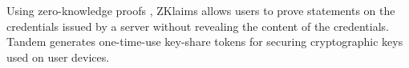 Using zero-knowledge proofs ,
ZKlaims \cite{zklaim} allows users to prove statements on the credentials issued by a server without revealing the content of the credentials.
Tandem \cite{tandem} generates one-time-use key-share tokens for securing cryptographic keys used on user devices. %



